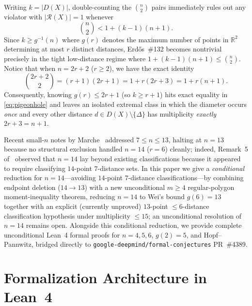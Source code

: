 \documentclass[11pt,reqno]{amsart}
\theoremstyle{definition}
\newcommand{\R}{\mathbb{R}}
\newcommand{\card}[1]{|#1|}
\begin{document}
Writing $k = \card{D(X)}$, double-counting the $\binom{n}{2}$ pairs immediately rules out any violator with $\card{\mathcal{R}(X)} = 1$ whenever
\begin{equation}\label{eq:pigeonhole}
\binom{n}{2} < 1 + (k - 1)(n + 1).
\end{equation}
Since $k \ge g^{-1}(n)$ where $g(r)$ denotes the maximum number of points in $\R^2$ determining at most $r$ distinct distances, Erd\H{o}s~\#132 becomes nontrivial precisely in the tight low-distance regime where $1 + (k - 1)(n + 1) \le \binom{n}{2}$. Notice that when $n = 2r + 2$ ($r \ge 2$), we have the exact identity
\[
\binom{2r + 2}{2} = (r + 1)(2r + 1) = 1 + r(2r + 3) = 1 + r(n + 1).
\]
Consequently, knowing $g(r) \le 2r + 1$ (so $k \ge r + 1$) hits exact equality in \eqref{eq:pigeonhole} and leaves an isolated extremal class in which the diameter occurs \emph{once} and every other distance $d \in D(X) \setminus \{\Delta\}$ has multiplicity \emph{exactly} $2r + 3 = n + 1$.

Recent small-$n$ notes by Marche~\cite{Ma26} addressed $7 \le n \le 13$, halting at $n = 13$ because no structural exclusion handled $n = 14$ ($r = 6$) cleanly; indeed, Remark~5 of~\cite{Ma26} observed that $n = 14$ lay beyond existing classifications because it appeared to require classifying $14$-point $7$-distance sets. In this paper we give a \emph{conditional} reduction for $n = 14$---avoiding $14$-point $7$-distance classifications---by combining endpoint deletion ($14 \to 13$) with a new unconditional $m \ge 4$ regular-polygon moment-inequality theorem, reducing $n = 14$ to Wei's bound $g(6) = 13$~\cite{We12} together with an explicit (currently unproved) $13$-point $\le 6$-distance classification hypothesis under multiplicity $\le 15$; an unconditional resolution of $n = 14$ remains open. Alongside this conditional reduction, we provide complete unconditional Lean~4 formal proofs for $n = 4, 5, 6$, $g(2) = 5$, and Hopf--Pannwitz, bridged directly to \texttt{google-deepmind/\allowbreak formal-conjectures} PR~\#4389.

\section{Formalization Architecture in Lean~4}
\end{document}
